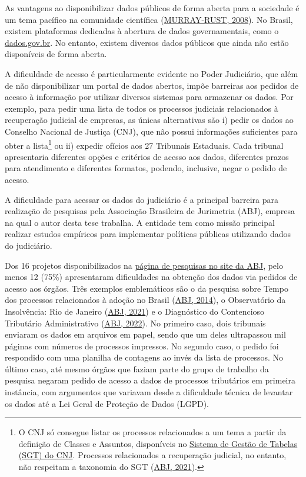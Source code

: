 \documentclass[12pt,twoside,brazilian]{book}
\begin{document}
As vantagens ao disponibilizar dados públicos de forma aberta para a
sociedade é um tema pacífico na comunidade científica
(\protect\hyperlink{ref-murray-rust2008}{MURRAY-RUST, 2008}). No Brasil,
existem plataformas dedicadas à abertura de dados governamentais, como o
\href{https://dados.gov.br}{dados.gov.br}. No entanto, existem diversos
dados públicos que ainda não estão disponíveis de forma aberta.

A dificuldade de acesso é particularmente evidente no Poder Judiciário,
que além de não disponibilizar um portal de dados abertos, impõe
barreiras aos pedidos de acesso à informação por utilizar diversos
sistemas para armazenar os dados. Por exemplo, para pedir uma lista de
todos os processos judiciais relacionados à recuperação judicial de
empresas, as únicas alternativas são i) pedir os dados ao Conselho
Nacional de Justiça (CNJ), que não possui informações suficientes para
obter a lista\footnote{O CNJ só consegue listar os processos
  relacionados a um tema a partir da definição de Classes e Assuntos,
  disponíveis no
  \href{https://www.cnj.jus.br/sgt/consulta_publica_classes.php}{Sistema
  de Gestão de Tabelas (SGT) do CNJ}. Processos relacionados a
  recuperação judicial, no entanto, não respeitam a taxonomia do SGT
  (\protect\hyperlink{ref-observat}{ABJ, 2021}).} ou ii) expedir ofícios
aos 27 Tribunais Estaduais. Cada tribunal apresentaria diferentes opções
e critérios de acesso aos dados, diferentes prazos para atendimento e
diferentes formatos, podendo, inclusive, negar o pedido de acesso.

A dificuldade para acessar os dados do judiciário é a principal barreira
para realização de pesquisas pela Associação Brasileira de Jurimetria
(ABJ), empresa na qual o autor desta tese trabalha. A entidade tem como
missão principal realizar estudos empíricos para implementar políticas
públicas utilizando dados do judiciário.

Dos 16 projetos disponibilizados na
\href{https://abj.org.br/pesquisas/}{página de pesquisas no site da
ABJ}, pelo menos 12 (75\%) apresentaram dificuldades na obtenção dos
dados via pedidos de acesso aos órgãos. Três exemplos emblemáticos são o
da pesquisa sobre Tempo dos processos relacionados à adoção no Brasil
(\protect\hyperlink{ref-tempodo}{ABJ, 2014}), o Observatório da
Insolvência: Rio de Janeiro (\protect\hyperlink{ref-observat}{ABJ,
2021}) e o Diagnóstico do Contencioso Tributário Administrativo
(\protect\hyperlink{ref-diagnosticoABJ}{ABJ, 2022}). No primeiro caso,
dois tribunais enviaram os dados em arquivos em papel, sendo que um
deles ultrapassou mil páginas com números de processos impressos. No
segundo caso, o pedido foi respondido com uma planilha de contagens ao
invés da lista de processos. No último caso, até mesmo órgãos que faziam
parte do grupo de trabalho da pesquisa negaram pedido de acesso a dados
de processos tributários em primeira instância, com argumentos que
variavam desde a dificuldade técnica de levantar os dados até a Lei
Geral de Proteção de Dados (LGPD).
\end{document}

